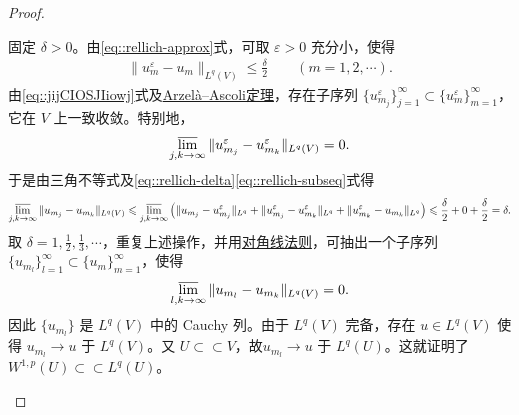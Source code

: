 \documentclass[../../main.tex]{subfiles}
\begin{document}
\begin{proof}
\begin{enumerate}[(1)]
固定 $\delta>0$。由\eqref{eq::rellich-approx}式，可取 $\varepsilon>0$ 充分小，使得
\begin{align}\label{eq::rellich-delta}
\|u_{m}^{\varepsilon}-u_{m}\|_{L^{q}(V)}\leqslant\frac{\delta}{2}\qquad (m=1,2,\cdots).
\end{align}
由\eqref{eq::jijCIOSJIiowj}式及\hyperref[Functional Analysis-theorem:泛函分析--Arzelà-Ascoli定理]{Arzelà--Ascoli定理}，存在子序列 $\{u_{m_{j}}^{\varepsilon}\}_{j=1}^{\infty}\subset\{u_{m}^{\varepsilon}\}_{m=1}^{\infty}$，它在 $V$ 上一致收敛。特别地，
\begin{align}\label{eq::rellich-subseq}
\varlimsup_{j,k\to\infty}\|u_{m_{j}}^{\varepsilon}-u_{m_{k}}^{\varepsilon}\|_{L^{q}(V)}=0.
\end{align}
于是由三角不等式及\eqref{eq::rellich-delta}\eqref{eq::rellich-subseq}式得
\begin{align*}
\varlimsup_{j,k\to\infty}\|u_{m_{j}}-u_{m_{k}}\|_{L^{q}(V)}
\leqslant\varlimsup_{j,k\to\infty}\left(\|u_{m_{j}}-u_{m_{j}}^{\varepsilon}\|_{L^{q}}+\|u_{m_{j}}^{\varepsilon}-u_{m_{k}}^{\varepsilon}\|_{L^{q}}+\|u_{m_{k}}^{\varepsilon}-u_{m_{k}}\|_{L^{q}}\right)\leqslant\frac{\delta}{2}+0+\frac{\delta}{2}=\delta.
\end{align*}
取 $\delta=1,\frac{1}{2},\frac{1}{3},\cdots$，重复上述操作，并用\hyperref[Functional Analysis-proposition:对角线法则]{对角线法则}，可抽出一个子序列 $\{u_{m_{l}}\}_{l=1}^{\infty}\subset\{u_{m}\}_{m=1}^{\infty}$，使得
\begin{align*}
\varlimsup_{l,k\to\infty}\|u_{m_{l}}-u_{m_{k}}\|_{L^{q}(V)}=0.
\end{align*}
因此 $\{u_{m_{l}}\}$ 是 $L^{q}(V)$ 中的 Cauchy 列。由于 $L^{q}(V)$ 完备，存在 $u\in L^{q}(V)$ 使得 $u_{m_{l}}\to u$ 于 $L^{q}(V)$。又 $U\subset \subset V$，故$u_{m_{l}}\to u$ 于 $L^{q}(U)$。这就证明了 $W^{1,p}(U)\subset\subset L^{q}(U)$。


\end{enumerate}
\end{proof}
\end{document}
